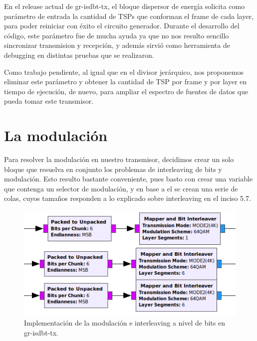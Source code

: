 En el release actual de gr-isdbt-tx, el bloque dispersor de energía solicita como parámetro de entrada la cantidad de TSPs que conforman el frame de cada layer, para poder reiniciar con éxito el circuito generador. Durante el desarrollo del código, este parámetro fue de mucha ayuda ya que no nos resulto sencillo sincronizar transmision y recepción, y además sirvió como herramienta de debugging en distintas pruebas que se realizaron. 

Como trabajo pendiente, al igual que en el divisor jerárquico, nos proponemos eliminar este parámetro y obtener la cantidad de TSP por frame y por layer en tiempo de ejecución, de nuevo, para ampliar el espectro de fuentes de datos que pueda tomar este transmisor. 
	
\section{La modulación}

Para resolver la modulación en nuestro transmisor, decidimos crear un solo bloque que resuelva en conjunto los problemas de interleaving de bits y modulación. Esto resulto bastante conveniente, pues basto con crear una variable que contenga un selector de modulación, y en base a el se crean una serie de colas, cuyos tamaños responden a lo explicado sobre interleaving en el inciso 5.7.

\begin{figure}[h!]
	\centering
	\includegraphics[scale=0.5]{figuras/cap05/modulacion}
	\caption{\label{f:modulacion} Implementación de la modulación e interleaving a nivel de bits en gr-isdbt-tx.}
\end{figure}


